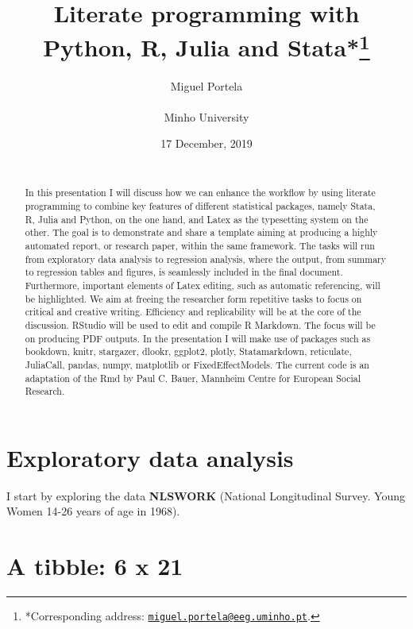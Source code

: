 \documentclass[
  12pt,
]{article}
\title{\vspace{1cm}Literate programming with Python, R, Julia and Stata*\footnote{*Corresponding address: \href{mailto:miguel.portela@eeg.uminho.pt}{\nolinkurl{miguel.portela@eeg.uminho.pt}}.}\vspace{0.5cm}\\}
\author{Miguel Portela\\
~\\
Minho University\\}
\date{17 December, 2019\\
~\\}
\begin{document}
\maketitle
\begin{abstract}
\noindent{}In this presentation I will discuss how we can enhance the workflow by using literate programming to combine key features of different statistical packages, namely Stata, R, Julia and Python, on the one hand, and Latex as the typesetting system on the other. The goal is to demonstrate and share a template aiming at producing a highly automated report, or research paper, within the same framework. The tasks will run from exploratory data analysis to regression analysis, where the output, from summary to regression tables and figures, is seamlessly included in the final document. Furthermore, important elements of Latex editing, such as automatic referencing, will be highlighted. We aim at freeing the researcher form repetitive tasks to focus on critical and creative writing. Efficiency and replicability will be at the core of the discussion. RStudio will be used to edit and compile R Markdown. The focus will be on producing PDF outputs. In the presentation I will make use of packages such as bookdown, knitr, stargazer, dlookr, ggplot2, plotly, Statamarkdown, reticulate, JuliaCall, pandas, numpy, matplotlib or FixedEffectModels. The current code is an adaptation of the Rmd by Paul C. Bauer, Mannheim Centre for European Social Research.\vspace{.8cm}
\end{abstract}

\clearpage

\renewcommand{\baselinestretch}{0.5}\normalsize

\renewcommand{\baselinestretch}{1.1}\normalsize

\clearpage

\hypertarget{exploratory-data-analysis}{%
\section{Exploratory data analysis}\label{exploratory-data-analysis}}

I start by exploring the data \textbf{NLSWORK} (National Longitudinal Survey. Young Women 14-26 years of age in 1968).

\hypertarget{a-tibble-6-x-21}{%
\section{A tibble: 6 x 21}\label{a-tibble-6-x-21}}
\end{document}
